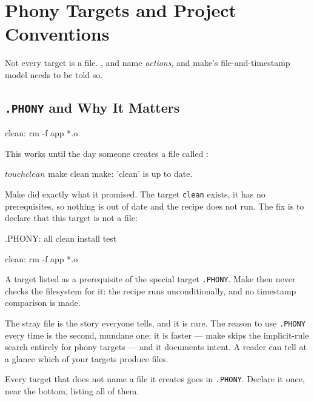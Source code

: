 \chapter{Phony Targets and Project Conventions}\label{ch:mk-phony}

Not every target is a file. ,  and  name \emph{actions}, and make's file-and-timestamp model needs to be
told so.

\section{\texorpdfstring{\texttt{.PHONY} and Why It Matters}{.PHONY and Why It Matters}}\label{sec:mk-phonyt}

\begin{makecode}
clean:
    rm -f app *.o
\end{makecode}

This works until the day someone creates a file called :

\begin{shell}
$ touch clean
$ make clean
make: 'clean' is up to date.
\end{shell}

Make did exactly what it promised. The target \texttt{clean} exists, it has no
prerequisites, so nothing is out of date and the recipe does not run. The fix
is to declare that this target is not a file:

\begin{makecode}
.PHONY: all clean install test

clean:
    rm -f app *.o
\end{makecode}

\begin{definition}
	A target listed as a prerequisite of the special target \texttt{.PHONY}. Make
	then never checks the filesystem for it: the recipe runs unconditionally, and
	no timestamp comparison is made.
\end{definition}

\begin{note}
	The stray file is the story everyone tells, and it is rare. The reason to use
	\texttt{.PHONY} every time is the second, mundane one: it is faster --- make
	skips the implicit-rule search entirely for phony targets --- and it documents
	intent. A reader can tell at a glance which of your targets produce files.
\end{note}

\begin{moral}
	Every target that does not name a file it creates goes in \texttt{.PHONY}.
	Declare it once, near the bottom, listing all of them.
\end{moral}

